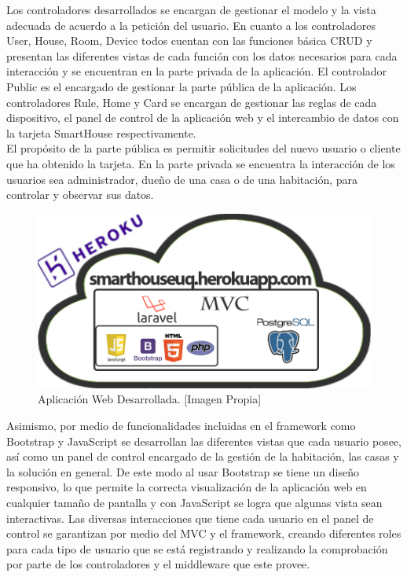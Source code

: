 Los controladores desarrollados se encargan de gestionar el modelo y la vista adecuada de acuerdo a la petición del usuario. En cuanto a los controladores User, House, Room, Device todos cuentan con las funciones básica CRUD y presentan las diferentes vistas de cada función con los datos necesarios para cada interacción y se encuentran en la parte privada de la aplicación. El controlador Public es el encargado de gestionar la parte pública de la aplicación. Los controladores Rule, Home y Card se encargan de gestionar las reglas de cada dispositivo, el panel de control de la aplicación web y el intercambio de datos con la tarjeta SmartHouse respectivamente.\\

El propósito de la parte pública es permitir solicitudes del nuevo usuario o cliente que ha obtenido la tarjeta. En la parte privada se encuentra la interacción de los usuarios sea administrador, dueño de una casa o de una habitación, para controlar y observar sus datos.\\


\begin{figure}[!t]
	\centering
	\caption[Aplicación Web Desarrollada.]{Aplicación Web Desarrollada. [Imagen Propia]}
	\label{fig:B_appweb}
	\includegraphics[width=0.5\linewidth]{Imagenes/B_ImplAPPweb}
\end{figure}

Asimismo, por medio de funcionalidades incluidas en el framework como Bootstrap y JavaScript se desarrollan las diferentes vistas que cada usuario posee, así como un panel de control encargado de la gestión de la habitación, las casas y la solución en general. De este modo al usar Bootstrap se tiene un diseño responsivo, lo que permite la correcta visualización de la aplicación web en cualquier tamaño de pantalla y con JavaScript se logra que algunas vista sean interactivas. Las diversas interacciones que tiene cada usuario en el panel de control se garantizan por medio del MVC y el framework, creando diferentes roles para cada tipo de usuario que se está registrando y realizando la comprobación por parte de los controladores y el middleware que este provee.\\

